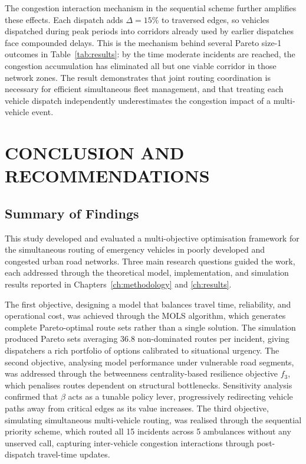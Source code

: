 \documentclass[paper=A4, 12pt, mathscr]{report}
\begin{document}
	The congestion interaction mechanism in the sequential scheme further
	amplifies these effects. Each dispatch adds $\Delta=15\%$ to traversed
	edges, so vehicles dispatched during peak periods into corridors already
	used by earlier dispatches face compounded delays. This is the mechanism
	behind several Pareto size-1 outcomes in Table~\ref{tab:results}: by the
	time moderate incidents are reached, the congestion accumulation has
	eliminated all but one viable corridor in those network zones. The
	result demonstrates that joint routing coordination is necessary for
	efficient simultaneous fleet management, and that treating each vehicle
	dispatch independently underestimates the congestion impact of a
	multi-vehicle event.
	
	
	\chapter{CONCLUSION AND RECOMMENDATIONS}
	
	\section{Summary of Findings}
	
	This study developed and evaluated a multi-objective optimisation framework for the simultaneous routing of emergency vehicles in poorly developed and congested urban road networks. Three main research questions guided the work, each addressed through the theoretical model, implementation, and simulation results reported in Chapters~\ref{ch:methodology} and \ref{ch:results}.
	
	The first objective,  designing a model that balances travel time, reliability, and operational cost,  was achieved through the MOLS algorithm, which generates complete Pareto-optimal route sets rather than a single solution. The simulation produced Pareto sets averaging 36.8 non-dominated routes per incident, giving dispatchers a rich portfolio of options calibrated to situational urgency. The second objective,  analysing model performance under vulnerable road segments,  was addressed through the betweenness centrality-based resilience objective $f_3$, which penalises routes dependent on structural bottlenecks. Sensitivity analysis confirmed that $\beta$ acts as a tunable policy lever, progressively redirecting vehicle paths away from critical edges as its value increases. The third objective,  simulating simultaneous multi-vehicle routing,  was realised through the sequential priority scheme, which routed all 15 incidents across 5 ambulances without any unserved call, capturing inter-vehicle congestion interactions through post-dispatch travel-time updates.
	
\end{document}
